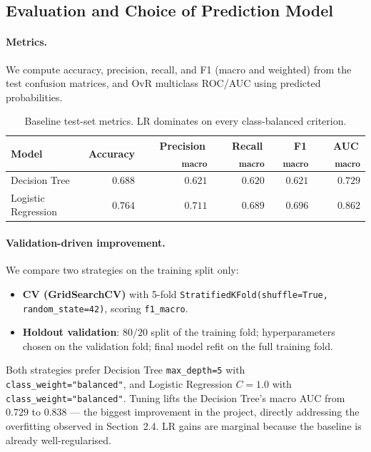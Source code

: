 \documentclass[11pt]{article}
\begin{document}
\subsection{Evaluation and Choice of Prediction Model}
\label{sec:eval}

\paragraph{Metrics.} We compute accuracy, precision, recall, and F1
(macro and weighted) from the test confusion matrices, and OvR
multiclass ROC/AUC using predicted probabilities.

\begin{table}[h]
  \centering
  \caption{Baseline test-set metrics. LR dominates on every
    class-balanced criterion.}
  \label{tab:metrics}
  \begin{tabular}{lrrrrr}
    \toprule
    Model & Accuracy & Precision\,\textsubscript{macro} & Recall\,\textsubscript{macro} & F1\,\textsubscript{macro} & AUC\,\textsubscript{macro} \\
    \midrule
    Decision Tree       & $0.688$ & $0.621$ & $0.620$ & $0.621$ & $0.729$ \\
    Logistic Regression & $0.764$ & $0.711$ & $0.689$ & $0.696$ & $0.862$ \\
    \bottomrule
  \end{tabular}
\end{table}

\paragraph{Validation-driven improvement.} We compare two strategies
on the training split only:
\begin{itemize}
  \item \textbf{CV (GridSearchCV)} with 5-fold
        \texttt{StratifiedKFold(shuffle=True, random\_state=42)},
        scoring \texttt{f1\_macro}.
  \item \textbf{Holdout validation}: $80/20$ split of the training
        fold; hyperparameters chosen on the validation fold; final
        model refit on the full training fold.
\end{itemize}

Both strategies prefer Decision Tree \texttt{max\_depth=5} with
\texttt{class\_weight="balanced"}, and Logistic Regression
$C{=}1.0$ with \texttt{class\_weight="balanced"}. Tuning lifts the
Decision Tree's macro AUC from $0.729$ to $0.838$ --- the biggest
improvement in the project, directly addressing the overfitting
observed in Section~2.4. LR gains are marginal because the baseline
is already well-regularised.
\end{document}
